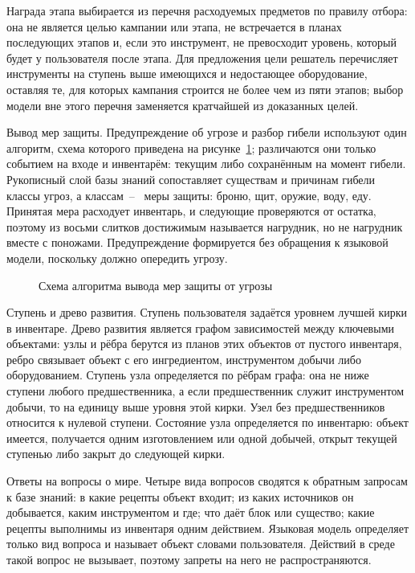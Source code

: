 Награда этапа выбирается из перечня расходуемых предметов по правилу отбора: она не
является целью кампании или этапа, не встречается в планах последующих этапов и, если
это инструмент, не превосходит уровень, который будет у пользователя после этапа. Для
предложения цели решатель перечисляет инструменты на ступень выше имеющихся и недостающее
оборудование, оставляя те, для которых кампания строится не более чем из пяти этапов;
выбор модели вне этого перечня заменяется кратчайшей из доказанных целей.

Вывод мер защиты. Предупреждение об угрозе и разбор гибели используют один алгоритм,
схема которого приведена на рисунке~\ref{fig:protection}; различаются они только
событием на входе и инвентарём: текущим либо сохранённым на момент гибели. Рукописный
слой базы знаний сопоставляет существам и причинам гибели классы угроз, а классам~--~
меры защиты: броню, щит, оружие, воду, еду. Принятая мера расходует инвентарь, и
следующие проверяются от остатка, поэтому из восьми слитков достижимым называется
нагрудник, но не нагрудник вместе с поножами. Предупреждение формируется без обращения
к языковой модели, поскольку должно опередить угрозу.

\begin{figure}[!htb]
  \centering
  
  \caption{Схема алгоритма вывода мер защиты от угрозы}
  \label{fig:protection}
\end{figure}

Ступень и древо развития. Ступень пользователя задаётся уровнем лучшей кирки в
инвентаре. Древо развития является графом зависимостей между ключевыми объектами: узлы
и рёбра берутся из планов этих объектов от пустого инвентаря, ребро связывает объект с
его ингредиентом, инструментом добычи либо оборудованием. Ступень узла определяется по рёбрам
графа: она не ниже ступени любого предшественника, а если предшественник служит
инструментом добычи, то на единицу выше уровня этой кирки. Узел без предшественников
относится к нулевой ступени. Состояние
узла определяется по инвентарю: объект имеется, получается одним изготовлением или одной
добычей, открыт текущей ступенью либо закрыт до следующей кирки.

Ответы на вопросы о мире. Четыре вида вопросов сводятся к обратным запросам к базе
знаний: в какие рецепты объект входит; из каких источников он добывается, каким
инструментом и где; что даёт блок или существо; какие рецепты выполнимы из инвентаря
одним действием. Языковая модель определяет только вид вопроса и называет объект словами
пользователя. Действий в среде такой вопрос не вызывает, поэтому запреты на него не
распространяются.

